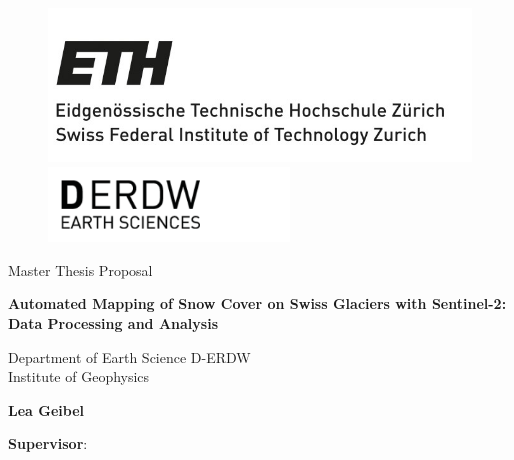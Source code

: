 \documentclass[12pt]{article}
\begin{document}
%
 \begin{titlepage}
\begin{figure}[h!]
\begin{minipage}[height=2cm]{0.4\linewidth}
    \includegraphics{ETH_logo}
\end{minipage}
\begin{minipage}[height=2cm, right]{0.2\linewidth}
	\begin{flushright}
    	\includegraphics[height = 2cm]{D-ERW_logo}
	\end{flushright}
\end{minipage}
\end{figure}


    \begin{center}

    	\Large 
    	Master Thesis Proposal
        \vspace*{1cm}
 
        \Huge
        \textbf{Automated Mapping of Snow Cover on Swiss Glaciers with Sentinel-2: Data Processing and Analysis}
 
        \vspace{0.5cm}
        \Large
        Department of Earth Science D-ERDW\\
        \large
         Institute of Geophysics
 
        \vspace{1.5cm}
 
 		
       \textbf{Lea Geibel}
 
 
        \vspace{2cm}
 		\normalsize
        \textbf{Supervisor}:
        

\end{center}
\end{titlepage}
\end{document}

